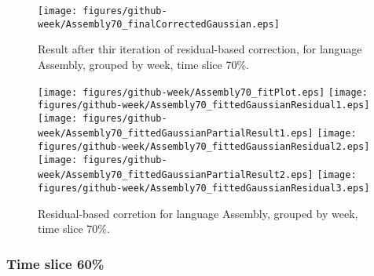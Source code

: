 \begin{figure}[]
\centering
{\texttt{[image: figures/github-week/Assembly70\_finalCorrectedGaussian.eps]}}
\caption{Result after thir iteration of residual-based correction, for language Assembly, grouped by week, time slice 70\%.}
\end{figure}


\begin{figure}[hb]
\centering
{}
{\texttt{[image: figures/github-week/Assembly70\_fitPlot.eps]}}
{\texttt{[image: figures/github-week/Assembly70\_fittedGaussianResidual1.eps]}}
{\texttt{[image: figures/github-week/Assembly70\_fittedGaussianPartialResult1.eps]}}
{\texttt{[image: figures/github-week/Assembly70\_fittedGaussianResidual2.eps]}}
{\texttt{[image: figures/github-week/Assembly70\_fittedGaussianPartialResult2.eps]}}
{\texttt{[image: figures/github-week/Assembly70\_fittedGaussianResidual3.eps]}}
\caption{Residual-based corretion for language Assembly, grouped by week, time slice 70\%.}
\end{figure}


\clearpage 
\newpage 


\FloatBarrier

\subsubsection{Time slice 60\%}


